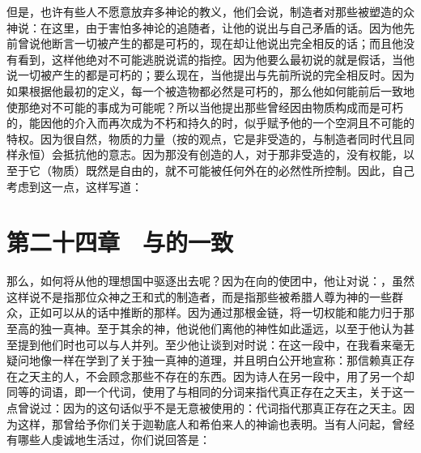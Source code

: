 但是，也许有些人不愿意放弃多神论的教义，他们会说，制造者对那些被塑造的众神说：在这里，由于害怕多神论的追随者，让他的说出与自己矛盾的话。因为他先前曾说他断言一切被产生的都是可朽的，现在却让他说出完全相反的话；而且他没有看到，这样他绝对不可能逃脱说谎的指控。因为他要么最初说的就是假话，当他说一切被产生的都是可朽的；要么现在，当他提出与先前所说的完全相反时。因为如果根据他最初的定义，每一个被造物都必然是可朽的，那么他如何能前后一致地使那绝对不可能的事成为可能呢？所以当他提出那些曾经因由物质构成而是可朽的，能因他的介入而再次成为不朽和持久的时，似乎赋予他的一个空洞且不可能的特权。因为很自然，物质的力量（按的观点，它是非受造的，与制造者同时代且同样永恒）会抵抗他的意志。因为那没有创造的人，对于那非受造的，没有权能，以至于它（物质）既然是自由的，就不可能被任何外在的必然性所控制。因此，自己考虑到这一点，这样写道：\par


\section{第二十四章　与的一致}

那么，如何将从他的理想国中驱逐出去呢？因为在向的使团中，他让对说：，虽然这样说不是指那位众神之王和式的制造者，而是指那些被希腊人尊为神的一些群众，正如可以从的话中推断的那样。因为通过那根金链，将一切权能和能力归于那至高的独一真神。至于其余的神，他说他们离他的神性如此遥远，以至于他认为甚至提到他们时也可以与人并列。至少他让谈到对时说：在这一段中，在我看来毫无疑问地像一样在学到了关于独一真神的道理，并且明白公开地宣称：那信赖真正存在之天主的人，不会顾念那些不存在的东西。因为诗人在另一段中，用了另一个却同等的词语，即一个代词，使用了与相同的分词来指代真正存在之天主，关于这一点曾说过：因为的这句话似乎不是无意被使用的：代词指代那真正存在之天主。因为这样，那曾给予你们关于迦勒底人和希伯来人的神谕也表明。当有人问起，曾经有哪些人虔诚地生活过，你们说回答是：\par

